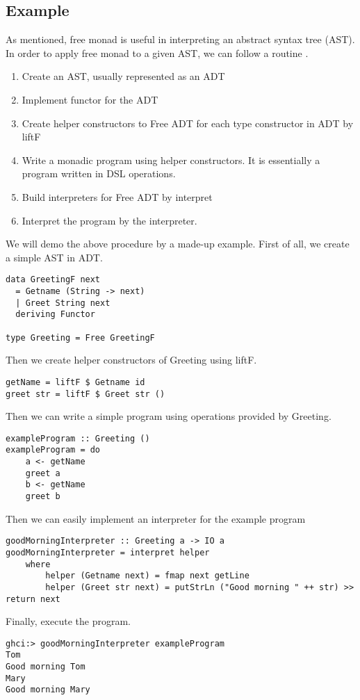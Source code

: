\subsection{Example} \label{b:fm:e}
As mentioned, free monad is useful in interpreting an abstract syntax tree (AST). In order to apply free monad to a given AST, we can follow a routine \cite{contributorsCatsFreeMonads}.
\begin{enumerate}
  \item Create an AST, usually represented as an ADT
  \item Implement functor for the ADT
  \item Create helper constructors to Free ADT for each type constructor in ADT by liftF 
  \item Write a monadic program using helper constructors. It is essentially a program written in DSL operations.
  \item Build interpreters for Free ADT by interpret
  \item Interpret the program by the interpreter.
\end{enumerate}
We will demo the above procedure by a made-up example. First of all, we create a simple AST in ADT. 
\begin{verbatim}
data GreetingF next
  = Getname (String -> next)
  | Greet String next
  deriving Functor

type Greeting = Free GreetingF
\end{verbatim}
Then we create helper constructors of Greeting using liftF.
\begin{verbatim}
getName = liftF $ Getname id
greet str = liftF $ Greet str ()
\end{verbatim}
Then we can write a simple program using operations provided by Greeting.
\begin{verbatim}
exampleProgram :: Greeting ()
exampleProgram = do
    a <- getName
    greet a
    b <- getName
    greet b
\end{verbatim}
Then we can easily implement an interpreter for the example program
\begin{verbatim}
goodMorningInterpreter :: Greeting a -> IO a
goodMorningInterpreter = interpret helper
    where
        helper (Getname next) = fmap next getLine
        helper (Greet str next) = putStrLn ("Good morning " ++ str) >> return next  
\end{verbatim} 
Finally, execute the program.
\begin{verbatim}
ghci:> goodMorningInterpreter exampleProgram
Tom
Good morning Tom
Mary
Good morning Mary
\end{verbatim}

